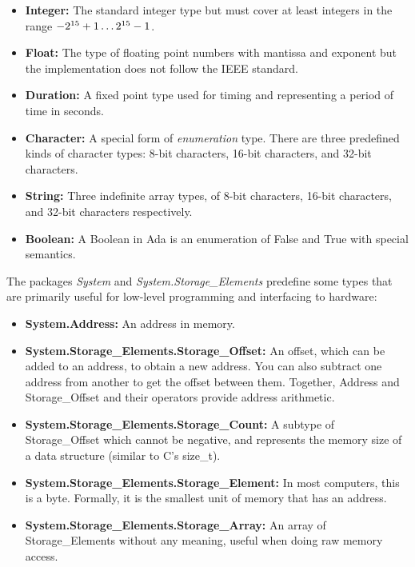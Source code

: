 \begin{itemize}

    \item \textbf{Integer:} The standard integer type but must cover at least
    integers in the range \(\rm -2^{15} + 1\ldots 2^{15} -1\).

    \item \textbf{Float:} The type of floating point numbers with mantissa and
      exponent but the implementation does not follow the IEEE
      standard.

    \item \textbf{Duration:} A fixed point type used for timing and
      representing a period of time in seconds.


    \item \textbf{Character:} A special form of \emph{enumeration} type. There
      are three predefined kinds of character types: 8-bit characters,
      16-bit characters, and 32-bit characters.

    \item \textbf{String:} Three indefinite array types, of 8-bit characters,
      16-bit characters, and 32-bit characters respectively.

    \item \textbf{Boolean:} A Boolean in Ada is an enumeration of False and
      True with special semantics.
   
  \end{itemize}


  The packages \emph{System} and \emph{System.Storage\_Elements} predefine some types that are primarily useful for low-level programming and  interfacing to hardware:

  \begin{itemize}

  \item \textbf{System.Address:} An address in memory.

   \item \textbf{System.Storage\_Elements.Storage\_Offset:} An offset, which can be
    added to an address, to obtain a new address.  You can also
    subtract one address from another to get the offset between
    them. Together, {\sf Address} and {\sf Storage\_Offset} and
    their operators provide address arithmetic.


  \item \textbf{System.Storage\_Elements.Storage\_Count:} A subtype of {\sf
      Storage\_Offset} which cannot be negative, and represents the
    memory size of a data structure (similar to C's size\_t).

  \item \textbf{System.Storage\_Elements.Storage\_Element:} In most computers,
    this is a byte. Formally, it is the smallest unit of memory that
    has an address.

  \item \textbf{System.Storage\_Elements.Storage\_Array:} An array of {\sf
      Storage\_Elements} without any meaning, useful when doing raw
    memory access.

  \end{itemize}


